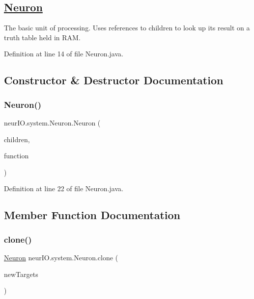 \subsection*{\hyperlink{classneur_i_o_1_1system_1_1_neuron}{Neuron} }

The basic unit of processing. Uses references to children to look up its result on a truth table held in R\+AM. 

Definition at line 14 of file Neuron.\+java.



\subsection{Constructor \& Destructor Documentation}
\mbox{\label{classneur_i_o_1_1system_1_1_neuron_af05fb9eac54b8f73ed831b3f1fd1f665}} 
\subsubsection{\texorpdfstring{Neuron()}{Neuron()}}
{\footnotesize\ttfamily neur\+I\+O.\+system.\+Neuron.\+Neuron (\begin{DoxyParamCaption}\item[{\hyperlink{classneur_i_o_1_1system_1_1_node}{Node} \mbox{[}$\,$\mbox{]}}]{children,  }\item[{\hyperlink{classneur_i_o_1_1system_1_1_truth_table}{Truth\+Table}}]{function }\end{DoxyParamCaption})}



Definition at line 22 of file Neuron.\+java.



\subsection{Member Function Documentation}
\mbox{\label{classneur_i_o_1_1system_1_1_neuron_afdfb793400c4507d3d94d07595e5f3f6}} 
\subsubsection{\texorpdfstring{clone()}{clone()}}
{\footnotesize\ttfamily \hyperlink{classneur_i_o_1_1system_1_1_neuron}{Neuron} neur\+I\+O.\+system.\+Neuron.\+clone (\begin{DoxyParamCaption}\item[{\hyperlink{classneur_i_o_1_1system_1_1_node}{Node} \mbox{[}$\,$\mbox{]}}]{new\+Targets }\end{DoxyParamCaption})}



